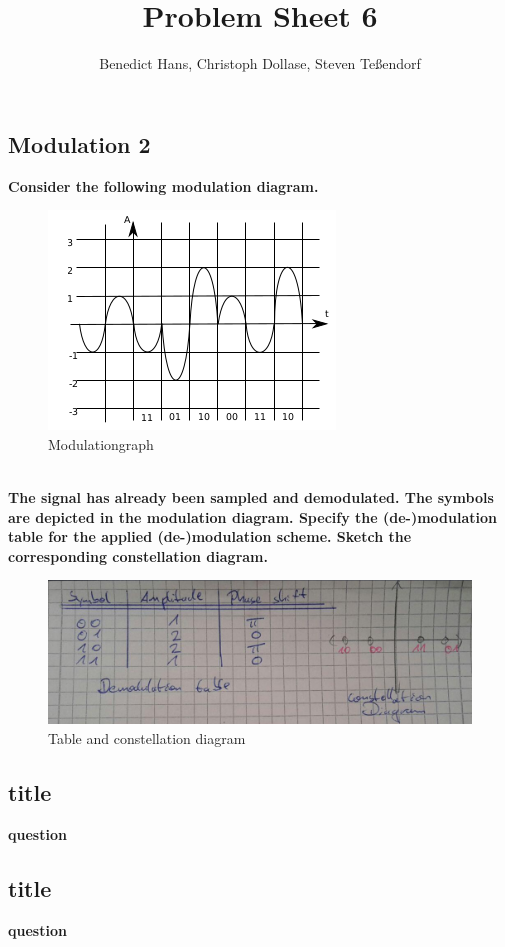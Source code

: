 \documentclass[a4paper,12pt]{article}
\author{Benedict Hans, Christoph Dollase, Steven Te\ss endorf}
\title{ \textbf{Problem Sheet 6}}
\begin{document}
	 
	\maketitle	 %
	
	\subsection{Modulation 2}
	\textbf{Consider the following modulation diagram.}
    
	\begin{figure}[h!]
		\includegraphics[width=0.4\linewidth]{modulation.png} 
    	\caption{Modulationgraph}
	\end{figure}
    \\
    \textbf{The signal has already been sampled and demodulated. The symbols are depicted in the 
	modulation diagram. Specify the (de-)modulation table for the applied (de-)modulation scheme.
	Sketch the corresponding constellation diagram.}

    \begin{figure}[h!] 
        \includegraphics[width=1\linewidth]{mod_solution.png} 
	    \caption{Table and constellation diagram}
    \end{figure}
	
	
	\subsection{title}
	\textbf{question}
	
	
	
	\subsection{title}
	\textbf{question}
	
	
\end{document}
